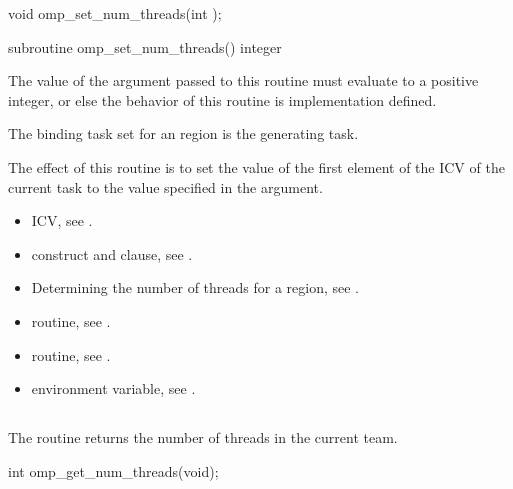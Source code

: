\format
\begin{ccppspecific}
\begin{ompcFunction}
void omp_set_num_threads(int );
\end{ompcFunction}
\end{ccppspecific}

\begin{fortranspecific}
\begin{ompfSubroutine}
subroutine omp_set_num_threads()
integer 
\end{ompfSubroutine}
\end{fortranspecific}

\constraints
The value of the argument passed to this routine must evaluate to a positive 
integer, or else the behavior of this routine is implementation defined.

\binding
The binding task set for an  region is 
the generating task.

\effect
The effect of this routine is to set the value of the first element of the 
 ICV of the current task to the value specified in the argument.

\crossreferences
\begin{itemize}
\item {} ICV, see
.

\item {} construct and  clause, see
.

\item Determining the number of threads for a  region, see
.

\item {} routine, see
.

\item {} routine, see
.

\item {} environment variable, see
.
\end{itemize}



\subsection{}
\label{subsec:omp_get_num_threads}
\summary
The  routine returns the number of threads 
in the current team.
\format
\begin{ccppspecific}
\begin{ompcFunction}
int omp_get_num_threads(void);
\end{ompcFunction}
\end{ccppspecific}

